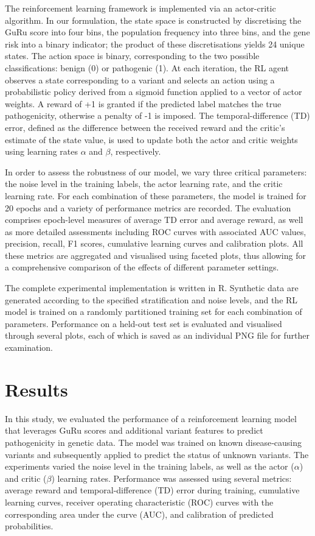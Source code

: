 The reinforcement learning framework is implemented via an actor-critic algorithm. In our formulation, the state space is constructed by discretising the GuRu score into four bins, the population frequency into three bins, and the gene risk into a binary indicator; the product of these discretisations yields 24 unique states. The action space is binary, corresponding to the two possible classifications: benign (0) or pathogenic (1). At each iteration, the RL agent observes a state corresponding to a variant and selects an action using a probabilistic policy derived from a sigmoid function applied to a vector of actor weights. A reward of +1 is granted if the predicted label matches the true pathogenicity, otherwise a penalty of -1 is imposed. The temporal-difference (TD) error, defined as the difference between the received reward and the critic’s estimate of the state value, is used to update both the actor and critic weights using learning rates $\alpha$ and $\beta$, respectively.

In order to assess the robustness of our model, we vary three critical parameters: the noise level in the training labels, the actor learning rate, and the critic learning rate. For each combination of these parameters, the model is trained for 20 epochs and a variety of performance metrics are recorded. The evaluation comprises epoch-level measures of average TD error and average reward, as well as more detailed assessments including ROC curves with associated AUC values, precision, recall, F1 scores, cumulative learning curves and calibration plots. All these metrics are aggregated and visualised using faceted plots, thus allowing for a comprehensive comparison of the effects of different parameter settings.

The complete experimental implementation is written in R. Synthetic data are generated according to the specified stratification and noise levels, and the RL model is trained on a randomly partitioned training set for each combination of parameters. Performance on a held-out test set is evaluated and visualised through several plots, each of which is saved as an individual PNG file for further examination.

\section{Results}

In this study, we evaluated the performance of a reinforcement learning model that leverages GuRu scores and additional variant features to predict pathogenicity in genetic data. The model was trained on known disease‐causing variants and subsequently applied to predict the status of unknown variants. The experiments varied the noise level in the training labels, as well as the actor ($\alpha$) and critic ($\beta$) learning rates. Performance was assessed using several metrics: average reward and temporal-difference (TD) error during training, cumulative learning curves, receiver operating characteristic (ROC) curves with the corresponding area under the curve (AUC), and calibration of predicted probabilities.

